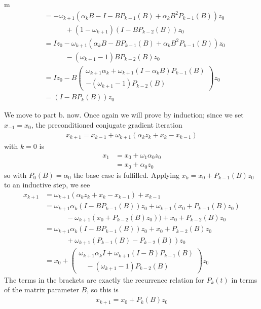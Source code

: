 \documentclass[11pt]{article}
\begin{document}
\begin{my proof}{m}
\begin{align*}
&= - \omega_{k+1}(\alpha_k B - I - BP_{k-1}(B) + \alpha_k B^2 P_{k-1}(B))z_0 \\
& \hspace{3em} + (1 - \omega_{k+1}) (I - B P_{k-2}(B))z_0 \\
&= Iz_0 - \omega_{k+1}(\alpha_k B - BP_{k-1}(B) + \alpha_k B^2 P_{k-1}(B))z_0 \\
& \hspace{3em} - (\omega_{k+1} - 1)  B P_{k-2}(B)z_0 \\
&= Iz_0 - B \begin{pmatrix} \omega_{k+1}\alpha_k + \omega_{k+1} (I - \alpha_k B)P_{k-1}(B) \\ - (\omega_{k+1} - 1) P_{k-2}(B)\end{pmatrix} z_0 \\
&= (I - B P_k(B)) z_0
\end{align*}

We move to part b. now. Once again we will prove by induction; since we set $x_{-1} = x_0$, the preconditioned conjugate gradient iteration \begin{gather*}
x_{k+1} = x_{k-1} + \omega_{k+1} (\alpha_k z_k + x_k - x_{k-1})
\end{gather*}
with $k=0$ is \begin{align*}
x_{1} &= x_{0} + \omega_{1} \alpha_0 z_0 \\
&= x_{0} + \alpha_0 z_0
\end{align*}
so with $P_0(B) = \alpha_0$ the base case is fulfilled. Applying $x_k = x_0 + P_{k-1}(B)z_0$ to an inductive step, we see \begin{align*}
x_{k+1} &=  \omega_{k+1} (\alpha_k z_k + x_k - x_{k-1}) + x_{k-1} \\
&=  \omega_{k+1} \alpha_k (I - B P_{k-1}(B))z_0 + \omega_{k+1}(x_0 + P_{k-1}(B)z_0) \\
& \hspace{3em} - \omega_{k+1}(x_0 + P_{k-2}(B)z_0)) + x_0 + P_{k-2}(B)z_0 \\
&=  \omega_{k+1} \alpha_k (I - B P_{k-1}(B))z_0  + x_0 + P_{k-2}(B)z_0 \\
& \hspace{3em}  + \omega_{k+1}( P_{k-1}(B) - P_{k-2}(B) )z_0 \\
&=  x_0 + \begin{pmatrix} \omega_{k+1}\alpha_k I  + \omega_{k+1} (I -B) P_{k-1}(B) \\ \quad - (\omega_{k+1} - 1) P_{k-2}(B)\end{pmatrix} z_0
\end{align*}
The terms in the brackets are exactly the recurrence relation for $P_{k}(t)$ in terms of the matrix parameter $B$, so this is \begin{gather*}
x_{k+1} = x_0 + P_k(B) z_0
\end{gather*}
\end{my proof}
\end{document}
